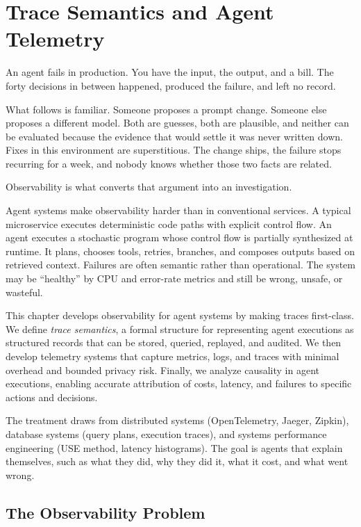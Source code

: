 \chapter{Trace Semantics and Agent Telemetry}
\label{ch:traces}

An agent fails in production. You have the input, the output, and a bill. The
forty decisions in between happened, produced the failure, and left no record.

What follows is familiar. Someone proposes a prompt change. Someone else proposes
a different model. Both are guesses, both are plausible, and neither can be
evaluated because the evidence that would settle it was never written down. Fixes
in this environment are superstitious. The change ships, the failure stops
recurring for a week, and nobody knows whether those two facts are related.

Observability is what converts that argument into an investigation.

Agent systems make observability harder than in conventional services. A typical microservice executes deterministic code paths with explicit control flow. An agent executes a stochastic program whose control flow is partially synthesized at runtime. It plans, chooses tools, retries, branches, and composes outputs based on retrieved context. Failures are often semantic rather than operational. The system may be ``healthy'' by CPU and error-rate metrics and still be wrong, unsafe, or wasteful.

This chapter develops observability for agent systems by making traces first-class. We define \emph{trace semantics}, a formal structure for representing agent executions as structured records that can be stored, queried, replayed, and audited. We then develop telemetry systems that capture metrics, logs, and traces with minimal overhead and bounded privacy risk. Finally, we analyze causality in agent executions, enabling accurate attribution of costs, latency, and failures to specific actions and decisions.

The treatment draws from distributed systems (OpenTelemetry, Jaeger, Zipkin), database systems (query plans, execution traces), and systems performance engineering (USE method, latency histograms). The goal is agents that explain themselves, such as what they did, why they did it, what it cost, and what went wrong.

\section{The Observability Problem}

